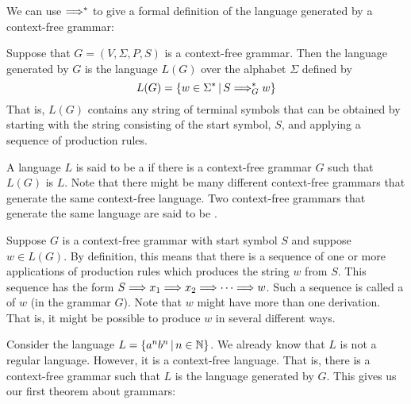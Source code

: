 We can use ${\Longrightarrow}^*$ to give a formal definition
of the language generated by a context-free grammar:

\begin{definition}
Suppose that  $G=(V,\Sigma,P,S)$ is a context-free grammar.
Then the language generated by $G$ is the language $L(G)$ over
the alphabet $\Sigma$ defined by
\[L(G)=\{w\in \Sigma^*\,|\, S\Longrightarrow_G^* w\}\]
That is, $L(G)$ contains any string of terminal symbols that can be 
obtained by starting with the string consisting of the start symbol, $S$, 
and applying a sequence of production rules.  

A language $L$ is said to be a  if
there is a context-free grammar $G$ such that $L(G)$ is $L$.
Note that there might be many different context-free grammars
that generate the same context-free language.  Two context-free
grammars that generate the same language are said to be
.
\end{definition}

Suppose $G$ is a context-free grammar with start symbol $S$
and suppose $w\in L(G)$.  By definition, this means that
there is a sequence of one or more applications of production rules
which produces the string $w$ from $S$.  This sequence has the
form $S\Longrightarrow x_1\Longrightarrow x_2\Longrightarrow\cdots\Longrightarrow w$.  Such a sequence
is called a  of $w$ (in the grammar $G$).  Note
that $w$ might have more than one derivation.  That is, it might
be possible to produce $w$ in several different ways.

Consider the language $L=\{a^nb^n\,|\, n\in{\mathbb N}\}$.  We already know
that $L$ is not a regular language.  However, it is a context-free
language.  That is, there is a context-free grammar such that
$L$ is the language generated by $G$.  This gives us our first
theorem about grammars:

